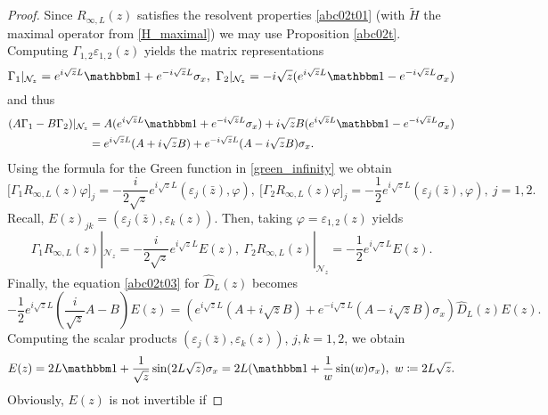 \begin{proof}
Since $R_{\infty,L}(z)$ satisfies the resolvent properties \eqref{abc02t01}
(with $\tilde H$ the maximal operator from \eqref{H_maximal}) we may use Proposition \ref{abc02t}.
Computing $\Gamma_{1,2}\varepsilon_{1,2}(z)$ yields the matrix representations
\begin{equation*}
  \Gamma_1|_{\mathcal{N}_z} = e^{i\sqrt{z}L}\id + e^{-i\sqrt{z}L}\sigma_x,\
  \Gamma_2|_{\mathcal{N}_z} = -i\sqrt{z} ( e^{i\sqrt{z}L}\id - e^{-i\sqrt{z}L}\sigma_x )
\end{equation*}
and thus
\begin{equation*}
\begin{split}
  (A\Gamma_1-B\Gamma_2)|_{\mathcal{N}_z}
    & = A(e^{i\sqrt{z}L}\id+e^{-i\sqrt{z}L}\sigma_x) +i\sqrt{z} B(e^{i\sqrt{z}L}\id-e^{-i\sqrt{z}L}\sigma_x) \\
    & = e^{i\sqrt{z}L}(A+i\sqrt{z}B) + e^{-i\sqrt{z}L}(A-i\sqrt{z}B)\sigma_x .
\end{split}
\end{equation*}
Using the formula for the Green function in \eqref{green_infinity} we obtain
\begin{equation*}
  \big[ \Gamma_1R_{\infty,L}(z)\varphi \big]_j = - \frac{i}{2\sqrt{z}}e^{i\sqrt{z}L} (\varepsilon_j(\bar z), \varphi)
  ,\
  \big[ \Gamma_2R_{\infty,L}(z)\varphi \big]_j = -\frac{1}{2} e^{i\sqrt{z}L} (\varepsilon_j(\bar z), \varphi)
  ,\ j=1,2 .
\end{equation*}
Recall, $E(z)_{jk} = (\varepsilon_j(\bar z),\varepsilon_k(z))$. Then, taking $\varphi=\varepsilon_{1,2}(z)$ yields
\begin{equation*}
  \Gamma_1R_{\infty,L}(z)|_{\mathcal{N}_z} = -\frac{i}{2\sqrt{z}}e^{i\sqrt{z}L} E(z),\
  \Gamma_2R_{\infty,L}(z)|_{\mathcal{N}_z} = -\frac{1}{2}e^{i\sqrt{z}L} E(z) .
\end{equation*}
Finally, the equation \eqref{abc02t03} for $\hat D_L(z)$ becomes
\begin{equation*}
  -\frac{1}{2}e^{i\sqrt{z}L} ( \frac{i}{\sqrt{z}}A-B)E(z)
    = ( e^{i\sqrt{z}L}(A+i\sqrt{z}B) + e^{-i\sqrt{z}L}(A-i\sqrt{z}B)\sigma_x ) \hat D_L(z)E(z) .
\end{equation*}
Computing the scalar products $(\varepsilon_j(\bar z),\varepsilon_k(z))$, $j,k=1,2$, we obtain
\begin{equation*}
  E(z) = 2L\id + \frac{1}{\sqrt{z}}\sin(2L\sqrt{z}) \sigma_x
       = 2L ( \id + \frac{1}{w}\sin(w)\sigma_x ),\ w\coloneqq 2L\sqrt{z} .
\end{equation*}
Obviously, $E(z)$ is not invertible if

\end{proof}

